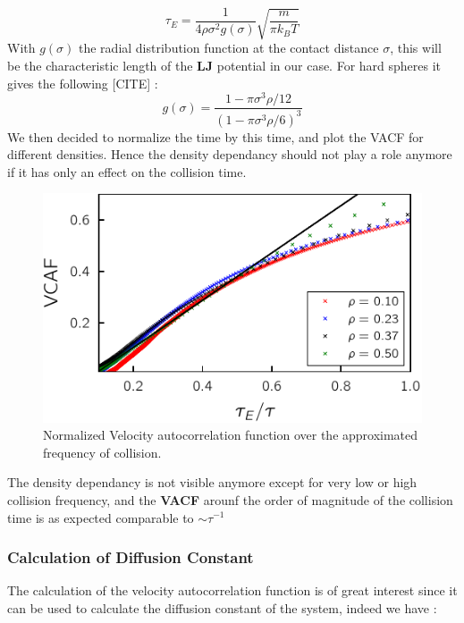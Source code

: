 \documentclass[ansiapaper]{report}
\begin{document}
\begin{multicols}{3}
 \begin{equation}
    \tau_E  = \frac{1}{4 \rho \sigma^2 g(\sigma)} \sqrt{\frac{m}{\pi k_B T}}
    \label{eq:mean_time_collision}
 \end{equation}
 With $g(\sigma)$ the radial distribution function at the contact distance $\sigma$, this will be the characteristic length of the \textbf{LJ} potential in our case. For hard spheres it gives the following [CITE] : $$ g(\sigma) = \frac{1 - \pi \sigma^3 \rho / 12}{(1 - \pi \sigma^3 \rho / 6)^3}$$
We then decided to normalize the time by this time, and plot the VACF for different densities. Hence the density dependancy should not play a role anymore if it has only an effect on the collision time.
 \begin{figure}[H]
    \begin{center}
        \includegraphics[width=1\linewidth]{figures/velocity_autocorrelation_density.pdf}
    \end{center}
    \caption{Normalized Velocity autocorrelation function over the approximated frequency of collision.}\label{fig:VCAF-thod}
\end{figure}
The density dependancy is not visible anymore except for very low or high collision frequency, and the \textbf{VACF} arounf the order of magnitude of the collision time is as expected comparable to $\sim \tau^{-1}$
\subsubsection{Calculation of Diffusion Constant}
The calculation of the velocity autocorrelation function is of great interest since it can be used to calculate the diffusion constant of the system, indeed we have : 


\end{multicols}
\end{document}
